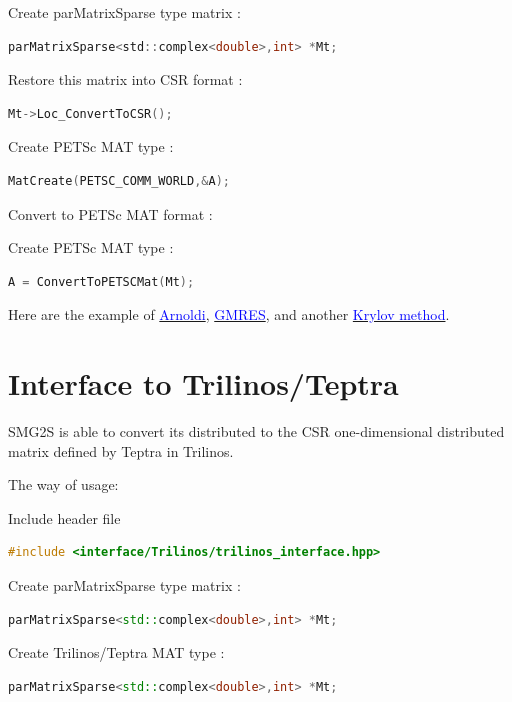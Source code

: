 \documentclass[a4paper, 10 pt]{report}
\begin{document}
	Create parMatrixSparse type matrix :
   \begin{lstlisting}[language=C,frame=single]
  parMatrixSparse<std::complex<double>,int> *Mt;
   \end{lstlisting}

	Restore this matrix into CSR format :
   \begin{lstlisting}[language=C,frame=single]
   Mt->Loc_ConvertToCSR();
	\end{lstlisting}

	Create PETSc MAT type :
   \begin{lstlisting}[language=C,frame=single]
   MatCreate(PETSC_COMM_WORLD,&A); 
	\end{lstlisting}

   Convert to PETSc MAT format :

	Create PETSc MAT type :
   \begin{lstlisting}[language=C,frame=single]
   A = ConvertToPETSCMat(Mt); 
   \end{lstlisting}

    Here are the example of \href{https://github.com/SMG2S/SMG2S/tree/master/example/arnoldi}{\textcolor{blue}{Arnoldi}}, \href{https://github.com/SMG2S/SMG2S/tree/master/example/gmres}{\textcolor{blue}{GMRES}}, and another  \href{https://github.com/SMG2S/SMG2S/tree/master/example/krylov}{\textcolor{blue}{Krylov method}}.
    
	\section{Interface to Trilinos/Teptra}
	
	SMG2S is able to convert its distributed to the CSR one-dimensional distributed matrix defined by Teptra in Trilinos.
	
	The way of usage:
	
	 Include header file

	\begin{lstlisting}[language=C++,frame=single]
   #include <interface/Trilinos/trilinos_interface.hpp>
	\end{lstlisting}
	
	Create parMatrixSparse type matrix :
	\begin{lstlisting}[language=C++,frame=single]
   parMatrixSparse<std::complex<double>,int> *Mt;
   \end{lstlisting}
	
	Create Trilinos/Teptra MAT type :
	\begin{lstlisting}[language=C++,frame=single]
   parMatrixSparse<std::complex<double>,int> *Mt;
	\end{lstlisting}
\end{document}
